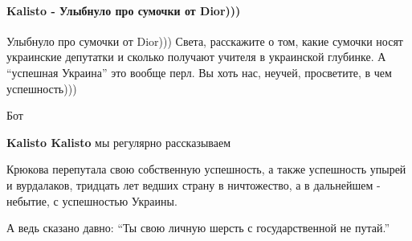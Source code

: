  
 
 
 
 
\paragraph{Kalisto - Улыбнуло про сумочки от Dior)))}

\begin{itemize}
 
Улыбнуло про сумочки от Dior))) Света, расскажите о том, какие сумочки носят украинские депутатки и сколько получают учителя в украинской глубинке. А \enquote{успешная Украина} это вообще перл. Вы хоть нас, неучей, просветите, в чем успешность)))

\begin{itemize}
 
Бот

 
\textbf{Kalisto Kalisto} мы регулярно рассказываем

 

Крюкова перепутала свою собственную успешность, а также успешность упырей и
вурдалаков, тридцать лет ведших страну в ничтожество, а в дальнейшем - небытие,
с успешностью Украины.

А ведь сказано давно: \enquote{Ты свою личную шерсть с государственной не путай.}



\end{itemize}
\end{itemize}
